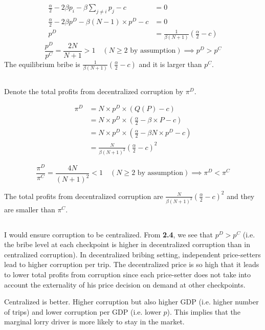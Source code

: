 \documentclass[a4paper]{article}
\begin{document}
\begin{align*}
    \frac{\alpha}{2}-2\beta p_i-\beta\sum_{j\neq i}p_j -c&=0 \\
    \frac{\alpha}{2}-2\beta p^D-\beta(N-1)\times p^D -c&=0 \\
    p^D&=\frac{1}{\beta(N+1)}\left(\frac{\alpha}{2}-c \right)
\end{align*}
\begin{equation*}
    \frac{p^D}{p^C}=\frac{2N}{N+1}>1\quad (N\geq 2\text{ by assumption})\implies p^D>p^C
\end{equation*}
The equilibrium bribe is $\frac{1}{\beta(N+1)}\left(\frac{\alpha}{2}-c \right)$ and it is larger than $p^C$.

\subsection{}

Denote the total profits from decentralized corruption by $\pi^D$.

\begin{align*}
    \pi^D&=N\times p^D \times (Q(P)-c) \\
    &=N\times p^D \times \left(\frac{\alpha}{2}-\beta\times P-c \right) \\
    &=N\times p^D \times \left(\frac{\alpha}{2}-\beta N\times p^D-c \right) \\
    &=\frac{N}{\beta(N+1)^2}\left(\frac{\alpha}{2}-c \right)^2
\end{align*}

\begin{equation*}
    \frac{\pi^D}{\pi^C}=\frac{4N}{(N+1)^2}<1 \quad (N\geq 2\text{ by assumption})\implies \pi^D<\pi^C
\end{equation*}

The total profits from decentralized corruption are $\frac{N}{\beta(N+1)^2}\left(\frac{\alpha}{2}-c \right)^2$ and they are smaller than $\pi^C$.

\subsection{}

I would ensure corruption to be centralized. From \textbf{2.4}, we see that $p^D>p^C$ (i.e. the bribe level at each checkpoint is higher in decentralized corruption than in centralized corruption). In decentralized bribing setting, independent price-setters lead to higher corruption per trip. The decentralized price is so high that it leads to lower total profits from corruption since each price-setter does not take into account the externality of his price decision on demand at other checkpoints.

Centralized is better. Higher corruption but also higher GDP (i.e. higher number of trips) and lower corruption per GDP (i.e. lower $p$). This implies that the marginal lorry driver is more likely to stay in the market.
\end{document}
